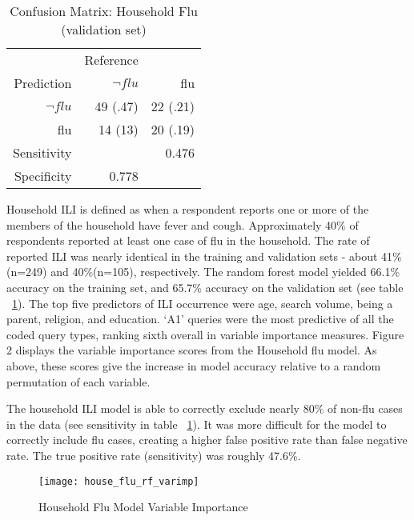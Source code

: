 \documentclass[12pt]{article}
\begin{document}
\begin{table}[!htbp]
\centering
  \caption{Confusion Matrix: Household Flu (validation set)} 
  \label{classif1} 
\begin{tabular}{rrr}
  \hline
    & Reference &   \\
Prediction    &      $\neg{flu}$  &  flu\\
                $\neg{flu}$ & 49 (.47)  & 22 (.21)  \\
                          flu & 14 (13)  &  20 (.19) \\
   \hline
   Sensitivity &   &  0.476 \\
   Specificity & 0.778  &   \\
   \hline
\end{tabular}
\end{table}


Household ILI is defined as when a respondent reports one or more of the members of the household have fever and cough. Approximately 40\% of respondents reported at least one case of flu in the household. The rate of reported ILI was nearly identical in the training and validation sets - about 41\% (n=249) and 40\%(n=105), respectively. The random forest model yielded 66.1\% accuracy on the training set, and 65.7\% accuracy on the validation set (see table ~\ref{classif1}). The top five predictors of ILI occurrence were age, search volume, being a parent, religion, and education. `A1' queries were the most predictive of all the coded query types, ranking sixth overall in variable importance measures. Figure 2 displays the variable importance scores from the Household flu model. As above, these scores give the increase in model accuracy relative to a random permutation of each variable. 

The household ILI model is able to correctly exclude nearly 80\% of non-flu cases in the data (see sensitivity in table ~\ref{classif1}). It was more difficult for the model to correctly include flu cases, creating a higher false positive rate than false negative rate. The true positive rate (sensitivity) was roughly 47.6\%. 

\begin{figure}[!htbp]
\begin{centering}
   \texttt{[image: house\_flu\_rf\_varimp]}
  \caption{Household Flu Model Variable Importance}
\label{house_rf}
\end{centering}
\end{figure}

\clearpage
\end{document}
